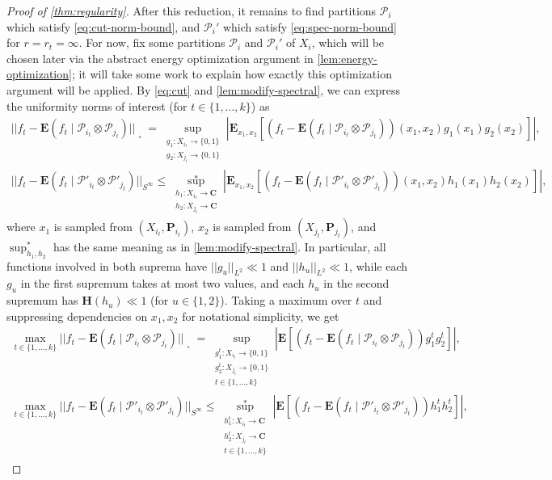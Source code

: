 \documentclass[reqno,11pt]{amsart}
\theoremstyle{definition}
\theoremstyle{remark}
\numberwithin{equation}{section}
\newcommand{\C}{\mathbf{C}}
\renewcommand{\P}{\mathbf{P}}
\renewcommand{\H}{\mathbf{H}}
\newcommand{\E}{\mathbf{E}}
\newcommand{\mP}{\mathcal{P}}
\newcommand{\sq}{_{\substack{ \\ \square}}}
\begin{document}
\begin{proof}[Proof of \cref{thm:regularity}]
After this reduction, it remains to find partitions $\mP_i$ which satisfy \cref{eq:cut-norm-bound}, and $\mP_i'$ which satisfy \cref{eq:spec-norm-bound} for $r = r_t = \infty$. For now, fix some partitions $\mP_i$ and $\mP_i'$ of $X_i$, which will be chosen later via the abstract energy optimization argument in \cref{lem:energy-optimization}; it will take some work to explain how exactly this optimization argument will be applied. By \cref{eq:cut} and \cref{lem:modify-spectral}, we can express the uniformity norms of interest (for $t \in \{1, \ldots, k\}$) as
\begin{gather*}
    ||f_t - \E(f_t \mid \mP_{i_t} \otimes \mP_{j_t})||\sq = \sup_{\substack{g_1 : X_{i_t} \to \{0,1\} \\ g_2 : X_{j_t} \to \{0,1\}}} |\E_{x_1,x_2}[(f_t - \E(f_t \mid \mP_{i_t} \otimes \mP_{j_t}))(x_1,x_2)g_1(x_1)g_2(x_2)]|,
    \\
    ||f_t - \E(f_t \mid \mP'_{i_t} \otimes \mP'_{j_t})||_{S^\infty} \le \sup_{\substack{h_1 : X_{i_t} \to \C \\ h_2 : X_{j_t} \to \C}}^* \left\vert \E_{x_1,x_2}[(f_t - \E(f_t \mid \mP'_{i_t} \otimes \mP'_{j_t}))(x_1,x_2)h_1(x_1)h_2(x_2)]\right\vert,
\end{gather*}
where $x_1$ is sampled from $(X_{i_t}, \P_{i_t})$, $x_2$ is sampled from $(X_{j_t}, \P_{j_t})$, and $\sup_{h_1,h_2}^*$ has the same meaning as in \cref{lem:modify-spectral}.
In particular, all functions involved in both suprema have $||g_u||_{L^2} \ll 1$ and $||h_u||_{L^2} \ll 1$, while each $g_u$ in the first supremum takes at most two values, and each $h_u$ in the second supremum has $\H(h_u) \ll 1$ (for $u \in \{1, 2\}$). Taking a maximum over $t$ and suppressing dependencies on $x_1, x_2$ for notational simplicity, we get
\begin{gather*}
    \max_{t \in \{1, \ldots, k\}} ||f_t - \E(f_t \mid \mP_{i_t} \otimes \mP_{j_t})||\sq = \sup_{\substack{g^t_1 : X_{i_t} \to \{0,1\} \\ g^t_2 : X_{j_t} \to \{0,1\} \\ t \in \{1, \ldots, k\}}} |\E[(f_t - \E(f_t \mid \mP_{i_t} \otimes \mP_{j_t}))g^t_1 g^t_2]|,
    \\
    \max_{t \in \{1, \ldots, k\}} ||f_t - \E(f_t \mid \mP'_{i_t} \otimes \mP'_{j_t})||_{S^\infty} \le \sup_{\substack{h^t_1 : X_{i_t} \to \C \\ h^t_2 : X_{j_t} \to \C \\ t \in \{1, \ldots, k\}}}^* \left\vert \E[(f_t - \E(f_t \mid \mP'_{i_t} \otimes \mP'_{j_t}))h^t_1 h^t_2]\right\vert,

\end{gather*}
\end{proof}
\end{document}
